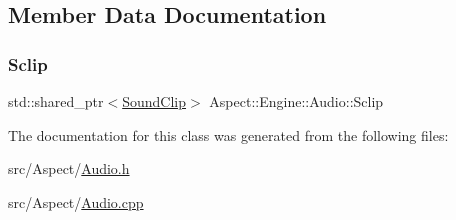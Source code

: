 \subsection{Member Data Documentation}
\mbox{\label{class_aspect_1_1_engine_1_1_audio_a883c5943b7fc9be22459e050ba8c7624}} 
\subsubsection{\texorpdfstring{Sclip}{Sclip}}
{\footnotesize\ttfamily std\+::shared\+\_\+ptr$<$\mbox{\hyperlink{struct_aspect_1_1_engine_1_1_sound_clip}{Sound\+Clip}}$>$ Aspect\+::\+Engine\+::\+Audio\+::\+Sclip\hspace{0.3cm}{\ttfamily [private]}}



The documentation for this class was generated from the following files\+:\begin{DoxyCompactItemize}
\item 
src/\+Aspect/\mbox{\hyperlink{_audio_8h}{Audio.\+h}}\item 
src/\+Aspect/\mbox{\hyperlink{_audio_8cpp}{Audio.\+cpp}}\end{DoxyCompactItemize}
